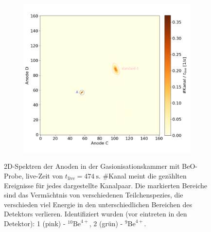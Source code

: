 \begin{figure}[H]
\begin{subfigure}{0.47\textwidth}
    \end{subfigure}
    \begin{subfigure}{0.47\textwidth}
        \centering
        \includegraphics[width=\linewidth]{Pictures/Gasdetektor/22_standard_CD.png}
    \end{subfigure}
    \caption{2D-Spektren der Anoden in der Gasionisationskammer mit BeO-Probe, live-Zeit von $t_{\text{live}} = \SI{474}{\second}$. \#Kanal meint die gezählten Ereignisse für jedes dargestellte Kanalpaar. Die markierten Bereiche sind das Vermächtnis von verschiedenen Teilchenspezies, die verschieden viel Energie in den unterschiedlichen Bereichen des Detektors verlieren. Identifiziert wurden (vor eintreten in den Detektor): 1 (pink) - $^{10}\text{Be}^{4+}$, 2 (grün) - $^{9}\text{Be}^{4+}$.}
    \label{Auswertung_Gasdetektor_2DSpektren_BeO}
\end{figure}
